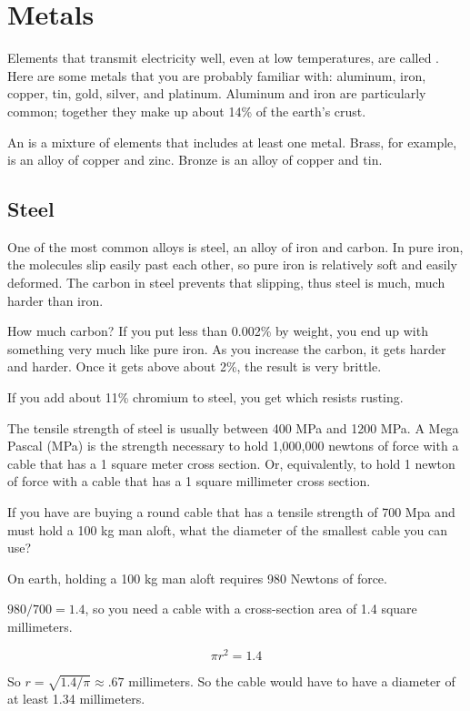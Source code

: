 \chapter{Metals}

Elements that transmit electricity well, even at low temperatures, are
called . Here are some metals that you are probably familiar
with: aluminum, iron, copper, tin, gold, silver, and platinum. Aluminum and
iron are particularly common; together they make up about 14\% of the
earth's crust.

An  is a mixture of elements that includes at least one
metal. Brass, for example, is an alloy of copper and zinc.  Bronze is
an alloy of copper and tin.

\section{Steel}

One of the most common alloys is steel, an alloy of iron and carbon.
In pure iron, the molecules slip easily past each other, so pure iron
is relatively soft and easily deformed. The carbon in steel prevents
that slipping, thus steel is much, much harder than iron.

How much carbon? If you put less than 0.002\% by weight, you end up
with something very much like pure iron.  As you increase the carbon,
it gets harder and harder.  Once it gets above about 2\%, the result
is very brittle.

If you add about 11\% chromium to steel, you get  which resists rusting.

\begin{Exercise}[title={Tensile Strength}, label=tensile-mpa]

The tensile strength of steel is usually between 400 MPa and 1200
MPa. A Mega Pascal (MPa) is the strength necessary to hold 1,000,000 newtons of
force with a cable that has a 1 square meter cross section. Or,
equivalently, to hold 1 newton of force with a cable that has a 1
square millimeter cross section. 

If you have are buying a round cable that has a tensile strength of
700 Mpa and must hold a 100 kg man aloft, what the diameter of the
smallest cable you can use?
  
\end{Exercise}
\begin{Answer}[ref=tensile-mpa]
On earth, holding a 100 kg man aloft requires 980 Newtons of force.

$980/700 = 1.4$, so you need a cable with a cross-section area of 1.4
square millimeters.

$$\pi r^2 = 1.4$$

So $r = \sqrt{1.4/\pi} \approx .67$ millimeters.  So the cable would
have to have a diameter of at least 1.34 millimeters.

\end{Answer}


